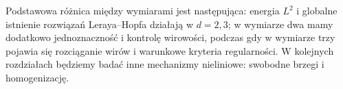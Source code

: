 Podstawowa różnica między wymiarami jest następująca:
energia $L^2$ i globalne istnienie rozwiązań Leraya--Hopfa
działają w $d=2,3$; w wymiarze dwa mamy dodatkowo
jednoznaczność i kontrolę wirowości, podczas gdy w wymiarze trzy
pojawia się rozciąganie wirów i warunkowe kryteria regularności.
W kolejnych rozdziałach będziemy badać inne mechanizmy
nieliniowe: swobodne brzegi i homogenizację.

